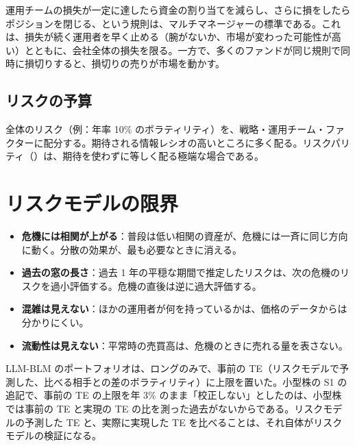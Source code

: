 運用チームの損失が一定に達したら資金の割り当てを減らし、さらに損をしたらポジションを閉じる、という規則は、マルチマネージャーの標準である。これは、損失が続く運用者を早く止める（腕がないか、市場が変わった可能性が高い）とともに、会社全体の損失を限る。一方で、多くのファンドが同じ規則で同時に損切りすると、損切りの売りが市場を動かす。

\subsection{リスクの予算}

全体のリスク（例：年率 10\% のボラティリティ）を、戦略・運用チーム・ファクターに配分する。期待される情報レシオの高いところに多く配る。リスクパリティ（）は、期待を使わずに等しく配る極端な場合である。

\section{リスクモデルの限界}

\begin{itemize}
\item \textbf{危機には相関が上がる}：普段は低い相関の資産が、危機には一斉に同じ方向に動く。分散の効果が、最も必要なときに消える。
\item \textbf{過去の窓の長さ}：過去 1 年の平穏な期間で推定したリスクは、次の危機のリスクを過小評価する。危機の直後は逆に過大評価する。
\item \textbf{混雑は見えない}：ほかの運用者が何を持っているかは、価格のデータからは分かりにくい。
\item \textbf{流動性は見えない}：平常時の売買高は、危機のときに売れる量を表さない。
\end{itemize}

\begin{projbox}
LLM-BLM のポートフォリオは、ロングのみで、事前の TE（リスクモデルで予測した、比べる相手との差のボラティリティ）に上限を置いた。小型株の S1 の追記で、事前の TE の上限を年 3\% のまま「校正しない」としたのは、小型株では事前の TE と実現の TE の比を測った過去がないからである。リスクモデルの予測した TE と、実際に実現した TE を比べることは、それ自体がリスクモデルの検証になる。
\end{projbox}
